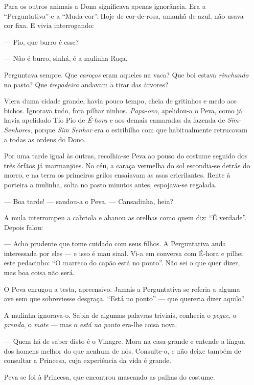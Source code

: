 Para os outros animais a Dona significava apenas ignorância. Era a
``Perguntativa'' e a ``Muda-cor''. Hoje de cor-de-rosa, amanhã de azul,
não usava cor fixa. E vivia interrogando:

--- Pio, que burro é esse?

--- Não é burro, sinhá, é a mulinha Ruça.

Perguntava sempre. Que \emph{caroços} eram aqueles na vaca? Que boi
estava \emph{rinchando} no pasto? Que \emph{trepadeira} andavam a tirar
das árvores?

Viera duma cidade grande, havia pouco tempo, cheia de gritinhos e medo
aos bichos. Ignorava tudo, fora pilhar ninhos. \emph{Papa-ovo},
apelidou-a o Peva, como já havia apelidado Tio Pio de \emph{É-hora} e
aos demais camaradas da fazenda de \emph{Sim-Senhores}, porque \emph{Sim
Senhor} era o estribilho com que habitualmente retrucavam a todas as
ordens do Dono.

Por uma tarde igual às outras, recolhia-se Peva ao pouso do costume
seguido dos três órfãos já marmanjões. No céu, a caraça vermelha do sol
escondia-se detrás do morro, e na terra os primeiros grilos ensaiavam as
asas cricrilantes. Rente à porteira a mulinha, solta no pasto minutos
antes, espojava-se regalada.

--- Boa tarde! --- saudou-a o Peva. --- Cansadinha, hein?

A mula interrompeu a cabriola e abanou as orelhas como quem diz: ``É
verdade''. Depois falou:

--- Acho prudente que tome cuidado com seus filhos. A Perguntativa anda
interessada por eles --- e isso é mau sinal. Vi-a em conversa com É-hora
e pilhei este pedacinho: ``O marreco do capão está no ponto''. Não sei o
que quer dizer, mas boa coisa não será.

O Peva enrugou a testa, apreensivo. Jamais a Perguntativa se referia a
alguma ave sem que sobreviesse desgraça. ``Está no ponto'' --- que
quereria dizer aquilo?

A mulinha ignorava-o. Sabia de algumas palavras triviais, conhecia o
\emph{pegue}, o \emph{prenda}, o \emph{mate} --- mas o \emph{está no
ponto} era-lhe coisa nova.

--- Quem há de saber disto é o Vinagre. Mora na casa-grande e entende a
língua dos homens melhor do que nenhum de nós. Consulte-o, e não deixe
também de consultar a Princesa, cuja experiência da vida é grande.

Peva se foi à Princesa, que encontrou mascando as palhas do costume.

